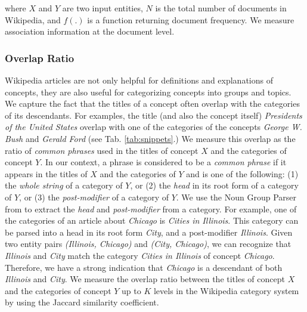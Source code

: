 
where $X$ and $Y$ are two input entities, $N$ is the total number of
documents in Wikipedia, and $f(.)$ is a function returning document
frequency. We measure association information at the document level.

\subsubsection{Overlap Ratio}
Wikipedia articles are not only helpful for definitions and
explanations of concepts, they are also useful for categorizing
concepts into groups and topics. We capture the fact that the titles
of a concept often overlap with the categories of its
descendants. For examples, the title (and also the concept itself)
{\em Presidents of the United States} overlap with one of the
categories of the concepts {\em George W. Bush} and {\em Gerald Ford}
(see Tab. \ref{tab:snippets}.) We measure this overlap
as the ratio of {\em common phrases} used in the titles of concept $X$
and the categories of concept $Y$. In our context, a phrase is
considered to be a {\em common phrase} if it appears in the titles of
$X$ and the categories of $Y$ and is one of the following: (1) the
{\em whole string} of a category of $Y$, or (2) the {\em head} in its
root form of a category of $Y$, or (3) the {\em post-modifier} of a
category of $Y$.
We use the Noun Group Parser from \cite{suchanek2007WWW} to extract
the {\em head} and {\em post-modifier} from a category. For example,
one of the categories of an article about \emph{Chicago} is
\emph{Cities in Illinois}. This category can be parsed into a head in
its root form \emph{City}, and a post-modifier \emph{Illinois}. Given
two entity pairs \emph{(Illinois, Chicago)} and \emph{(City,
  Chicago)}, we can recognize that \emph{Illinois} and \emph{City}
match the category {\em Cities in Illinois} of concept {\em
  Chicago}. Therefore, we have a strong indication that {\em Chicago}
is a descendant of both {\em Illinois} and {\em City}. We measure the
overlap ratio between the titles of concept $X$ and the categories of
concept $Y$ up to $K$ levels in the Wikipedia category system by using
the Jaccard similarity coefficient.


